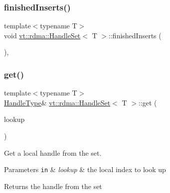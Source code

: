 \subsubsection{\texorpdfstring{finished\+Inserts()}{finishedInserts()}}
{\footnotesize\ttfamily template$<$typename T$>$ \\
void \hyperlink{structvt_1_1rdma_1_1_handle_set}{vt\+::rdma\+::\+Handle\+Set}$<$ T $>$\+::finished\+Inserts (\begin{DoxyParamCaption}{ }\end{DoxyParamCaption})\hspace{0.3cm}{\ttfamily [inline]}, {\ttfamily [private]}}

\mbox{\label{structvt_1_1rdma_1_1_handle_set_a7142722ee5cb3dfaece2f4296d8fcf8d}} 
\subsubsection{\texorpdfstring{get()}{get()}}
{\footnotesize\ttfamily template$<$typename T$>$ \\
\hyperlink{structvt_1_1rdma_1_1_handle_set_ab3a698ee86bae503dfa84617205b2dd9}{Handle\+Type}\& \hyperlink{structvt_1_1rdma_1_1_handle_set}{vt\+::rdma\+::\+Handle\+Set}$<$ T $>$\+::get (\begin{DoxyParamCaption}\item[{\hyperlink{structvt_1_1rdma_1_1_handle_set_a81d333ec397f0becb9fe692e53145441}{Lookup\+Type}}]{lookup }\end{DoxyParamCaption})\hspace{0.3cm}{\ttfamily [inline]}}



Get a local handle from the set. 


\begin{DoxyParams}[1]{Parameters}
\mbox{\tt in}  & {\em lookup} & the local index to look up\\
\hline
\end{DoxyParams}
\begin{DoxyReturn}{Returns}
the handle from the set 
\end{DoxyReturn}
\mbox{\label{structvt_1_1rdma_1_1_handle_set_a9b83c1e278ad60647007350339443643}} 
